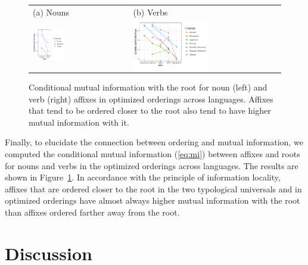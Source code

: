 \documentclass[11pt,letterpaper]{article}
\begin{document}
\begin{figure}
    \centering
    \begin{tabular}{lll}
    (a) Nouns & (b) Verbs \\ 
    \includegraphics[width=0.35\textwidth]{figures/visualizeCPMI.R_nouns.pdf} &
    \includegraphics[width=0.55\textwidth]{figures/visualizeCPMI.R_verbs.pdf}
    \end{tabular}
    \caption{Conditional mutual information with the root for noun (left) and verb (right) affixes in optimized orderings across languages. Affixes that tend to be ordered closer to the root also tend to have higher mutual information with it.}
    \label{fig:cmis}
\end{figure}

Finally, to elucidate the connection between ordering and mutual information, we computed the conditional mutual information (\ref{eq:mi}) between affixes and roots for nouns and verbs in the optimized orderings across languages.
The results are shown in Figure~\ref{fig:cmis}.
In accordance with the principle of information locality, affixes that are ordered closer to the root in the two typological universals and in optimized orderings have almost always higher mutual information with the root than affixes ordered farther away from the root.



\section{Discussion}\label{sec:discussion}
\end{document}
